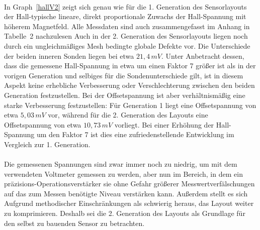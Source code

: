 \documentclass[12pt, a4paper]{article}
\begin{document}
\paragraph{}
In Graph~\ref*{hallV2} zeigt sich genau wie für die 1. Generation des Sensorlayouts der Hall-typische lineare, direkt proportionale Zuwachs der Hall-Spannung mit höherem Magnetfeld.\newline 
Alle Messdaten sind auch zusammengefasst im Anhang in Tabelle~2 nachzulesen\newline
Auch in der 2. Generation des Sensorlayouts liegen noch durch ein ungleichmäßiges Mesh bedingte globale Defekte vor. Die Unterschiede der beiden inneren Sonden liegen bei etwa $21,4\,mV$. Unter Anbetracht dessen, dass die gemessene Hall-Spannung in etwa um einen Faktor 7 größer ist als in der vorigen Generation und selbiges für die Sondenunterschiede gilt, ist in diesem Aspekt keine erhebliche Verbesserung oder Verschlechterung zwischen den beiden Generation festzustellen.\newline
Bei der Offsetspannung ist aber verhältnismäßig eine starke Verbesserung festzustellen: Für Generation 1 liegt eine Offsetspannung von etwa $5,03\,mV$ vor, während für die 2. Generation des Layouts eine Offsetspannung von etwa $10,73\,mV$ vorliegt. Bei einer Erhöhung der Hall-Spannung um den Faktor 7 ist dies eine zufriedenstellende Entwicklung im Vergleich zur 1. Generation.\paragraph{}
Die gemessenen Spannungen sind zwar immer noch zu niedrig, um mit dem verwendeten Voltmeter gemessen zu werden, aber nun im Bereich, in dem ein präzisions-Operationsverstärker sie ohne Gefahr größerer Messwertverfälschungen auf das zum Messen benötigte Niveau verstärken kann. Außerdem stellt es sich Aufgrund methodischer Einschränkungen als schwierig heraus, das Layout weiter zu komprimieren. Deshalb sei die 2. Generation des Layouts als Grundlage für den selbst zu bauenden Sensor zu betrachten.
\end{document}
